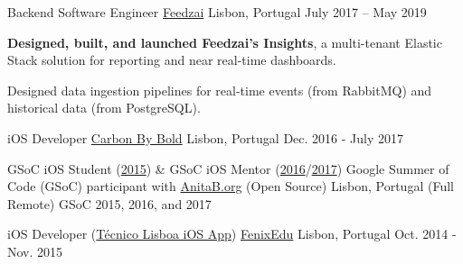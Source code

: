 \begin{cventries}
  \cventry
    {Backend Software Engineer}
    {\href{https://feedzai.com/}{Feedzai}}
    {Lisbon, Portugal}
    {July 2017 – May 2019}
    {
      \begin{cvitems}
        \item \textbf{Designed, built, and launched Feedzai's Insights}, a multi-tenant Elastic Stack solution for reporting and near real-time dashboards.
        \item Designed data ingestion pipelines for real-time events (from RabbitMQ) and historical data (from PostgreSQL).
      \end{cvitems}
      \vspace{4mm}
    }


  \cventryShort
    {iOS Developer}
    {\href{https://www.carbonbybold.com/pt-pt/}{Carbon By Bold}}
    {Lisbon, Portugal}
    {Dec. 2016 - July 2017}


  \cventryShort
    {GSoC iOS Student (\href{https://docs.google.com/presentation/d/1yv4XuNNpTgDkyOjL9SSjGe7PSZuwpbah42mQCACxdXQ/}{2015}) \& GSoC iOS Mentor (\href{https://summerofcode.withgoogle.com/archive/2016/projects/5509901874888704/}{2016}/\href{https://summerofcode.withgoogle.com/archive/2017/projects/5508656065937408/}{2017})}
    {Google Summer of Code (GSoC) participant with \href{http://anitaborg.org/}{AnitaB.org} (Open Source)}
    {Lisbon, Portugal (Full Remote)}
    {GSoC 2015, 2016, and 2017}


  \cventryShort
    {iOS Developer (\href{https://apps.apple.com/us/app/tecnico-lisboa/id959976468}{Técnico Lisboa iOS App})}
    {\href{http://fenixedu.org/}{FenixEdu}}
    {Lisbon, Portugal}
    {Oct. 2014 - Nov. 2015}
\end{cventries}

